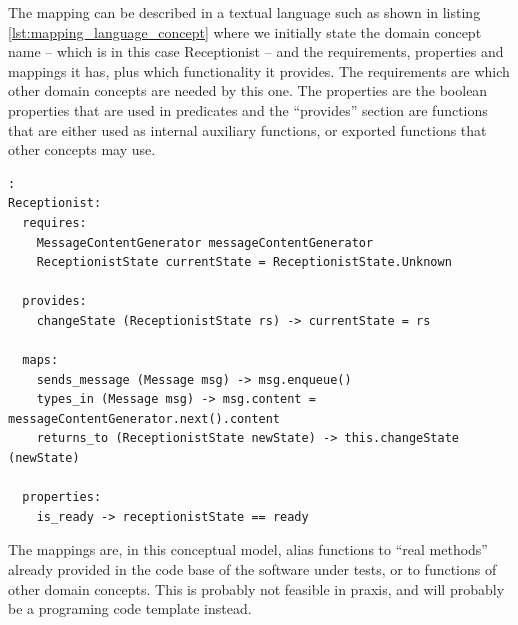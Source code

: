 The mapping can be described in a textual language such as shown in listing \ref{lst:mapping_language_concept} where we initially state the domain concept name -- which is in this case Receptionist -- and the requirements, properties and mappings it has, plus which functionality it provides. The requirements are which other domain concepts are needed by this one. The properties are the boolean properties that are used in predicates and the ``provides'' section are functions that are either used as internal auxiliary functions, or exported functions that other concepts may use.

\begin{lstlisting}[caption=example language for mapping concepts,label={lst:mapping_language_concept}]:
Receptionist:
  requires:
    MessageContentGenerator messageContentGenerator
    ReceptionistState currentState = ReceptionistState.Unknown
  
  provides:
    changeState (ReceptionistState rs) -> currentState = rs
  
  maps:
    sends_message (Message msg) -> msg.enqueue()
    types_in (Message msg) -> msg.content = messageContentGenerator.next().content
    returns_to (ReceptionistState newState) -> this.changeState (newState)

  properties:
    is_ready -> receptionistState == ready
\end{lstlisting}
The mappings are, in this conceptual model, alias functions to ``real methods'' already provided in the code base of the software under tests, or to functions of other domain concepts. This is probably not feasible in praxis, and will probably be a programing code template instead.

